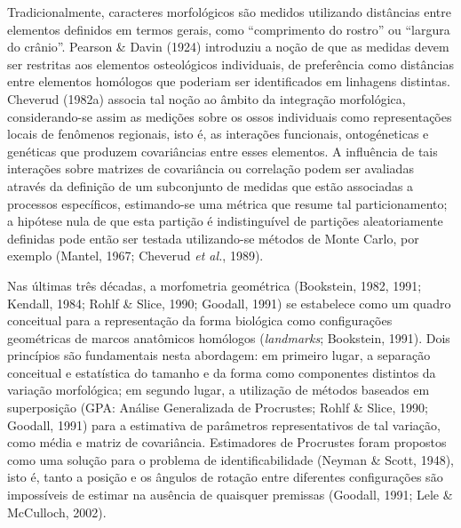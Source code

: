 \documentclass[12pt,twoside]{report}
\begin{document}
Tradicionalmente, caracteres morfológicos são medidos utilizando
distâncias entre elementos definidos em termos gerais, como
``comprimento do rostro'' ou ``largura do crânio''. Pearson \& Davin
(1924) introduziu a noção de que as medidas devem ser restritas aos
elementos osteológicos individuais, de preferência como distâncias entre
elementos homólogos que poderiam ser identificados em linhagens
distintas. Cheverud (1982a) associa tal noção ao âmbito da integração
morfológica, considerando-se assim as medições sobre os ossos
individuais como representações locais de fenômenos regionais, isto é,
as interações funcionais, ontogéneticas e genéticas que produzem
covariâncias entre esses elementos. A influência de tais interações
sobre matrizes de covariância ou correlação podem ser avaliadas através
da definição de um subconjunto de medidas que estão associadas a
processos específicos, estimando-se uma métrica que resume tal
particionamento; a hipótese nula de que esta partição é indistinguível
de partições aleatoriamente definidas pode então ser testada
utilizando-se métodos de Monte Carlo, por exemplo (Mantel, 1967;
Cheverud \emph{et al.}, 1989).

Nas últimas três décadas, a morfometria geométrica (Bookstein, 1982,
1991; Kendall, 1984; Rohlf \& Slice, 1990; Goodall, 1991) se estabelece
como um quadro conceitual para a representação da forma biológica como
configurações geométricas de marcos anatômicos homólogos
(\emph{landmarks}; Bookstein, 1991). Dois princípios são fundamentais
nesta abordagem: em primeiro lugar, a separação conceitual e estatística
do tamanho e da forma como componentes distintos da variação
morfológica; em segundo lugar, a utilização de métodos baseados em
superposição (GPA: Análise Generalizada de Procrustes; Rohlf \& Slice,
1990; Goodall, 1991) para a estimativa de parâmetros representativos de
tal variação, como média e matriz de covariância. Estimadores de
Procrustes foram propostos como uma solução para o problema de
identificabilidade (Neyman \& Scott, 1948), isto é, tanto a posição e os
ângulos de rotação entre diferentes configurações são impossíveis de
estimar na ausência de quaisquer premissas (Goodall, 1991; Lele \&
McCulloch, 2002).
\end{document}
